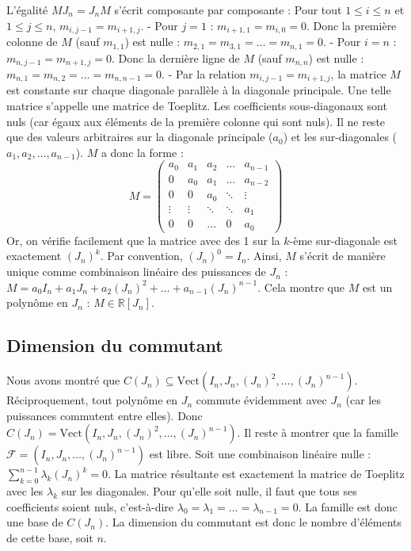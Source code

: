 \documentclass[11pt,a4paper]{article}
\begin{document}
L'égalité $M J_n = J_n M$ s'écrit composante par composante :
Pour tout $1 \le i \le n$ et $1 \le j \le n$, $m_{i, j-1} = m_{i+1, j}$.
- Pour $j=1$ : $m_{i+1, 1} = m_{i, 0} = 0$. Donc la première colonne de $M$ (sauf $m_{1,1}$) est nulle : $m_{2,1} = m_{3,1} = \dots = m_{n,1} = 0$.
- Pour $i=n$ : $m_{n, j-1} = m_{n+1, j} = 0$. Donc la dernière ligne de $M$ (sauf $m_{n,n}$) est nulle : $m_{n,1} = m_{n,2} = \dots = m_{n,n-1} = 0$.
- Par la relation $m_{i, j-1} = m_{i+1, j}$, la matrice $M$ est constante sur chaque diagonale parallèle à la diagonale principale. Une telle matrice s'appelle une matrice de Toeplitz.
Les coefficients sous-diagonaux sont nuls (car égaux aux éléments de la première colonne qui sont nuls).
Il ne reste que des valeurs arbitraires sur la diagonale principale ($a_0$) et les sur-diagonales ($a_1, a_2, \dots, a_{n-1}$).
$M$ a donc la forme :
$$M = \begin{pmatrix} a_0 & a_1 & a_2 & \dots & a_{n-1} \\ 0 & a_0 & a_1 & \dots & a_{n-2} \\ 0 & 0 & a_0 & \ddots & \vdots \\ \vdots & \vdots & \ddots & \ddots & a_1 \\ 0 & 0 & \dots & 0 & a_0 \end{pmatrix}$$
Or, on vérifie facilement que la matrice avec des 1 sur la $k$-ème sur-diagonale est exactement $(J_n)^k$.
Par convention, $(J_n)^0 = I_n$.
Ainsi, $M$ s'écrit de manière unique comme combinaison linéaire des puissances de $J_n$ :
$M = a_0 I_n + a_1 J_n + a_2 (J_n)^2 + \dots + a_{n-1} (J_n)^{n-1}$.
Cela montre que $M$ est un polynôme en $J_n$ : $M \in \mathbb{R}[J_n]$.

\subsection{Dimension du commutant}
Nous avons montré que $C(J_n) \subseteq \text{Vect}(I_n, J_n, (J_n)^2, \dots, (J_n)^{n-1})$.
Réciproquement, tout polynôme en $J_n$ commute évidemment avec $J_n$ (car les puissances commutent entre elles).
Donc $C(J_n) = \text{Vect}(I_n, J_n, (J_n)^2, \dots, (J_n)^{n-1})$.
Il reste à montrer que la famille $\mathcal{F} = (I_n, J_n, \dots, (J_n)^{n-1})$ est libre.
Soit une combinaison linéaire nulle : $\sum_{k=0}^{n-1} \lambda_k (J_n)^k = 0$.
La matrice résultante est exactement la matrice de Toeplitz avec les $\lambda_k$ sur les diagonales. Pour qu'elle soit nulle, il faut que tous ses coefficients soient nuls, c'est-à-dire $\lambda_0 = \lambda_1 = \dots = \lambda_{n-1} = 0$.
La famille est donc une base de $C(J_n)$.
La dimension du commutant est donc le nombre d'éléments de cette base, soit $n$.
\end{document}
